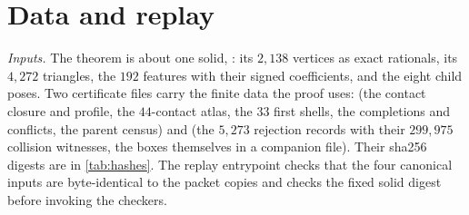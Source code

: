 \section{Data and replay}\label{app:data}

\emph{Inputs.} The theorem is about one solid, : its $2{,}138$
vertices as exact rationals, its $4{,}272$ triangles, the $192$ features with their signed
coefficients, and the eight child poses. Two certificate files carry the finite data the proof
uses:  (the contact closure and profile, the
$44$-contact atlas, the $33$ first shells, the completions and conflicts, the parent census) and
 (the $5{,}273$ rejection records with
their $299{,}975$ collision witnesses, the boxes themselves in a companion file). Their sha256
digests are in \cref{tab:hashes}. The replay entrypoint checks that the four canonical inputs are
byte-identical to the packet copies and checks the fixed solid digest before invoking the
checkers.

\begin{table}[ht]
  \centering
  \caption{Input hashes and tool versions, computed at the state of the repository described in
  this paper (FIGURES.md, Table 6).}
  \label{tab:hashes}
  \small
  
\end{table}

